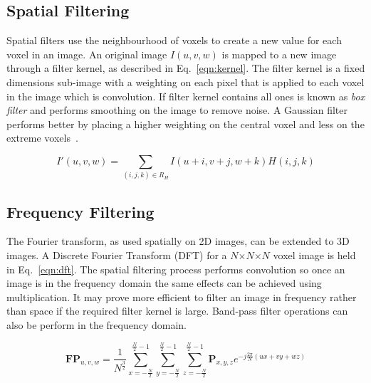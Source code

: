 \documentclass[journal]{IEEEtran}
\begin{document}
\subsection{Spatial Filtering}
Spatial filters use the neighbourhood of voxels to create a new value for each voxel in an image. 
An original image $I(u,v,w)$ is mapped to a new image through a filter kernel, as described in Eq.~\ref{eqn:kernel}.
The filter kernel is a fixed dimensions sub-image with a weighting on each pixel that is applied to each voxel in the image which is convolution.
If filter kernel contains all ones is known as \emph{box filter} and performs smoothing on the image to remove noise.
A Gaussian filter performs better by placing a higher weighting on the central voxel and less on the extreme voxels~\cite{lohmann1998volumetric}.


\begin{equation}
	I'(u,v,w) = \sum\limits_{(i,j,k) \in R_H} I(u + i,v + j, w + k)H(i,j,k)
	\label{eqn:kernel} 
\end{equation}



\subsection{Frequency Filtering}
The Fourier transform, as used spatially on 2D images, can be extended to 3D images.
A Discrete Fourier Transform (DFT) for a $N$$\times$$N$$\times$$N$ voxel image is held in Eq.~\ref{eqn:dft}.
The spatial filtering process performs convolution so once an image is in the frequency domain the same effects can be achieved using multiplication.
It may prove more efficient to filter an image in frequency rather than space if the required filter kernel is large.
Band-pass filter operations can also be perform in the frequency domain.

\begin{equation}
	\textbf{FP}_{u,v,w} = \frac{1}{N^{\frac{3}{2}}} \sum\limits_{x=-\frac{N}{2}}^{\frac{N}{2}-1}\sum\limits_{y=-\frac{N}{2}}^{\frac{N}{2}-1}\sum\limits_{z=-\frac{N}{2}}^{\frac{N}{2}-1}\textbf{P}_{x,y,z}e^{-j\frac{2\pi}{N}(ux + vy + wz)}
	\label{eqn:dft} 
\end{equation}
\end{document}
